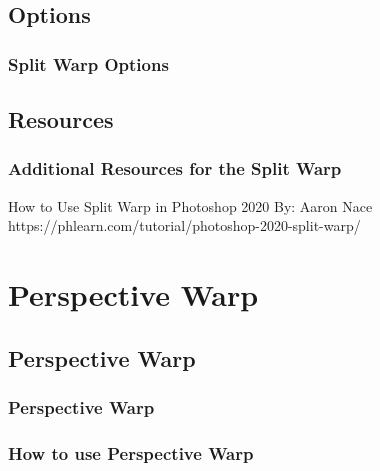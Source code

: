 \documentclass{beamer}
\begin{document}
\subsection{Options}		
\begin{frame}
	\frametitle{Split Warp Options}
	\begin{outline}
		\1 
	\end{outline}
\end{frame}

\subsection{Resources}		
\begin{frame}
	\frametitle{Additional Resources for the Split Warp}
	\begin{outline}
		\1 How to Use Split Warp in Photoshop 2020
		\2  By:  Aaron Nace
		\2 https://phlearn.com/tutorial/photoshop-2020-split-warp/
	\end{outline}
\end{frame}

\section{Perspective Warp}

\subsection{Perspective Warp}		

\begin{frame}
	\frametitle{Perspective Warp}
	\begin{outline}
		\1 
	\end{outline}
\end{frame}

\begin{frame}
	\frametitle{How to use Perspective Warp}
	\begin{outline}
		\1 
	\end{outline}
\end{frame}
\end{document}
